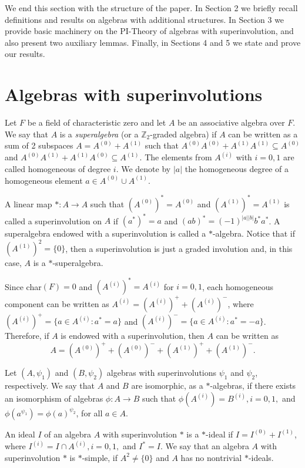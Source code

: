 \documentclass[11pt]{amsart}
\theoremstyle{definition}
\theoremstyle{remark}
\begin{document}
We end this section with the structure of the paper. In Section 2 we briefly recall definitions and results on algebras with additional structures. In Section 3 we provide basic machinery on the PI-Theory of algebras with superinvolution, and also present two auxiliary lemmas. Finally, in Sections 4 and 5 we state and prove our results.


\section{Algebras with superinvolutions}
	
	Let $F$ be a field of characteristic zero and let $A$ be an associative algebra over $F$. We say that $A$  is a {\em superalgebra} (or a $\mathbb{Z}_2$-graded algebra) if $A$ can be written as a sum of 2 subspaces $A=A^{(0)}+A^{(1)}$ such that $A^{(0)}A^{(0)}+A^{(1)}A^{(1)} \subseteq A^{(0)}$ and $A^{(0)}A^{(1)}+A^{(1)}A^{(0)}\subseteq A^{(1)}$. The elements from $A^{(i)}$ with $i=0,1$ are called homogeneous of degree $i$. We denote by $|a|$ the homogeneous degree of a homogeneous element $a\in A^{(0)}\cup A^{(1)}.$ 
	
	A linear map $*:A\to A$ such that $(A^{(0)})^*=A^{(0)}$ and $(A^{(1)})^*=A^{(1)}$ is called a superinvolution on $A$ if $(a^*)^*=a$ and $(ab)^*=(-1)^{|a||b|}b^*a^*$. A superalgebra endowed with a superinvolution is called a $*$-algebra. Notice that if $(A^{(1)})^2=\{0\}$, then a superinvolution is just a graded involution and, in this case, $A$ is a $*$-superalgebra.    
	
	Since char$(F)=0$ and $(A^{(i)})^*=A^{(i)}$ for
    $i=0,1$, each homogeneous component can be written as $A^{(i)}=(A^{(i)})^+ +(A^{(i)})^-$, where $(A^{(i)})^+=\{a\in A^{(i)}:a^*=a\}$ and $(A^{(i)})^-=\{a\in A^{(i)}:a^*=-a\}$. Therefore, if $A$ is endowed with a superinvolution, then $A$ can be written as $$A=(A^{(0)})^+ +(A^{(0)})^- + (A^{(1)})^+ + (A^{(1)})^-.$$
	
	Let $(A,\psi_1)$ and $(B,\psi_2)$ algebras with superinvolutions $\psi_1$ and $\psi_2$, respectively. We say that $A$ and $B$ are isomorphic, as a $*$-algebras, if there exists an isomorphism of algebras $\phi:A\to B$ such that $\phi(A^{(i)})=B^{(i)},i=0,1,$ and $\phi(a^{\psi_1})=\phi(a)^{\psi_2}$, for all $a\in A$.
	
	An ideal $I$ of an algebra $A$ with superinvolution $*$ is a $*$-ideal if $I=I^{(0)}+I^{(1)}$, where $I^{(i)}=I\cap A^{(i)}, i=0,1,$ and $I^*=I$. We say that an algebra $A$ with superinvolution $*$ is $*$-simple, if $A^{2}\neq \{0\}$ and $A$ has no nontrivial $*$-ideals.
	
\end{document}
